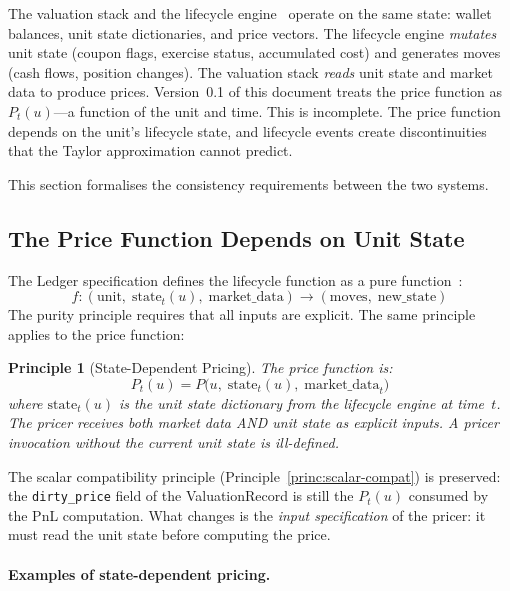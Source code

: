 \documentclass[11pt,a4paper]{article}
\newtheorem{principle}[definition]{Principle}
\begin{document}
The valuation stack and the lifecycle engine~\cite[\S7]{ledger} operate on the same state: wallet balances, unit state dictionaries, and price vectors.  The lifecycle engine \emph{mutates} unit state (coupon flags, exercise status, accumulated cost) and generates moves (cash flows, position changes).  The valuation stack \emph{reads} unit state and market data to produce prices.  Version~0.1 of this document treats the price function as $P_t(u)$---a function of the unit and time.  This is incomplete.  The price function depends on the unit's lifecycle state, and lifecycle events create discontinuities that the Taylor approximation cannot predict.

This section formalises the consistency requirements between the two systems.

\subsection{The Price Function Depends on Unit State}
\label{sec:price-state-dep}

The Ledger specification defines the lifecycle function as a pure function~\cite[\S7.4]{ledger}:
\[
f : (\text{unit}, \;\text{state}_t(u), \;\text{market\_data}) \to (\text{moves}, \;\text{new\_state})
\]
The purity principle requires that all inputs are explicit.  The same principle applies to the price function:

\begin{principle}[State-Dependent Pricing]
\label{princ:state-dep-pricing}
The price function is:
\[
P_t(u) = P\bigl(u,\; \mathrm{state}_t(u),\; \mathrm{market\_data}_t\bigr)
\]
where $\mathrm{state}_t(u)$ is the unit state dictionary from the lifecycle engine at time~$t$.  The pricer receives both market data AND unit state as explicit inputs.  A pricer invocation without the current unit state is ill-defined.
\end{principle}

\noindent The scalar compatibility principle (Principle~\ref{princ:scalar-compat}) is preserved: the \texttt{dirty\_price} field of the ValuationRecord is still the $P_t(u)$ consumed by the PnL computation.  What changes is the \emph{input specification} of the pricer: it must read the unit state before computing the price.

\paragraph{Examples of state-dependent pricing.}
\end{document}
